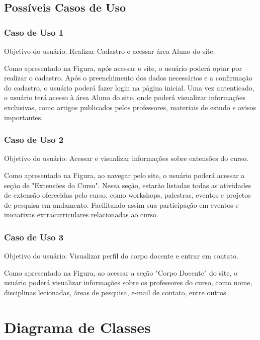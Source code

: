 \documentclass[a4paper,12pt]{report}
\begin{document}
\subsection{Possíveis Casos de Uso}
 
\subsubsection{Caso de Uso 1}
 
Objetivo do usuário: Realizar Cadastro e acessar área Aluno do site.
 
Como apresentado na Figura, após acessar o site, o usuário poderá optar por realizar o cadastro. Após o preenchimento dos dados necessários e a confirmação do cadastro, o usuário poderá fazer login na página inicial. Uma vez autenticado, o usuário terá acesso à área Aluno do site, onde poderá visualizar informações exclusivas, como artigos publicados pelos professores, materiais de estudo e avisos importantes.
 
\subsubsection{Caso de Uso 2}
 
Objetivo do usuário: Acessar e visualizar informações sobre extensões do curso.
 
Como apresentado na Figura, ao navegar pelo site, o usuário poderá acessar a seção de "Extensões do Curso". Nessa seção, estarão listadas todas as atividades de extensão oferecidas pelo curso, como workshops, palestras, eventos e projetos de pesquisa em andamento. Facilitando assim sua participação em eventos e iniciativas extracurriculares relacionadas ao curso.
 
\subsubsection{Caso de Uso 3}
 
Objetivo do usuário: Visualizar perfil do corpo docente e entrar em contato.
 
Como apresentado na Figura, ao acessar a seção "Corpo Docente" do site, o usuário poderá visualizar informações sobre os professores do curso, como nome, disciplinas lecionadas, áreas de pesquisa, e-mail de contato, entre outros.

\section{Diagrama de Classes}
 
\end{document}
